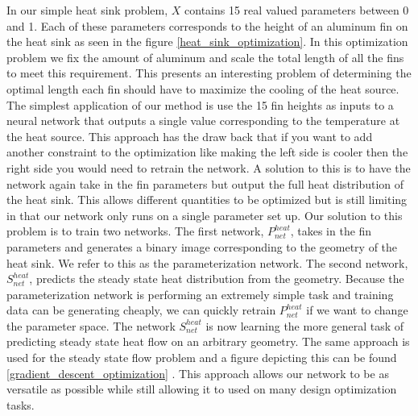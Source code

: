 \documentclass{article} %
\begin{document}
In our simple heat sink problem, $X$ contains 15 real valued parameters between 0 and 1. Each of these parameters corresponds to the height of an aluminum fin on the heat sink as seen in the figure \ref{heat_sink_optimization}. In this optimization problem we fix the amount of aluminum and scale the total length of all the fins to meet this requirement. This presents an interesting problem of determining the optimal length each fin should have to maximize the cooling of the heat source. The simplest application of our method is use the 15 fin heights as inputs to a neural network that outputs a single value corresponding to the temperature at the heat source. This approach has the draw back that if you want to add another constraint to the optimization like making the left side is cooler then the right side you would need to retrain the network. A solution to this is to have the network again take in the fin parameters but output the full heat distribution of the heat sink. This allows different quantities to be optimized but is still limiting in that our network only runs on a single parameter set up. Our solution to this problem is to train two networks. The first network, $P^{heat}_{net}$, takes in the fin parameters and generates a binary image corresponding to the geometry of the heat sink. We refer to this as the parameterization network. The second network, $S^{heat}_{net}$, predicts the steady state heat distribution from the geometry. Because the parameterization network is performing an extremely simple task and training data can be generating cheaply, we can quickly retrain $P^{heat}_{net}$ if we want to change the parameter space. The network $S^{heat}_{net}$ is now learning the more general task of predicting steady state heat flow on an arbitrary geometry. The same approach is used for the steady state flow problem and a figure depicting this can be found \ref{gradient_descent_optimization} . This approach allows our network to be as versatile as possible while still allowing it to used on many design optimization tasks.
\end{document}
